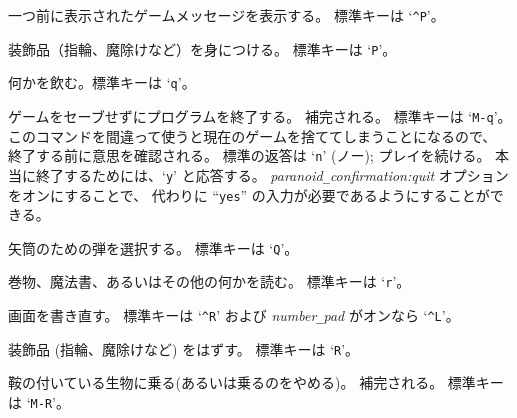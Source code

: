 一つ前に表示されたゲームメッセージを表示する。
標準キーは `{\tt \^{}P}'。
\item[\tb{\#puton}]
装飾品（指輪、魔除けなど）を身につける。
標準キーは `{\tt P}'。
\item[\tb{\#quaff}]
何かを飲む。標準キーは `{\tt q}'。
\item[\tb{\#quit}]
ゲームをセーブせずにプログラムを終了する。
補完される。
標準キーは `{\tt M-q}'。\\
このコマンドを間違って使うと現在のゲームを捨ててしまうことになるので、
終了する前に意思を確認される。
標準の返答は `{\tt n}' (ノー); プレイを続ける。
本当に終了するためには、`{\tt y}' と応答する。
{\it paranoid\verb+_+confirmation:quit\/} オプションをオンにすることで、
代わりに ``{\tt yes}'' の入力が必要であるようにすることができる。
\item[\tb{\#quiver}]
矢筒のための弾を選択する。
標準キーは `{\tt Q}'。
\item[\tb{\#read}]
巻物、魔法書、あるいはその他の何かを読む。
標準キーは `{\tt r}'。
\item[\tb{\#redraw}]
画面を書き直す。
標準キーは `{\tt \^{}R}' および
{\it number\verb+_+pad\/} がオンなら `{\tt \^{}L}'。
\item[\tb{\#remove}]
装飾品 (指輪、魔除けなど) をはずす。
標準キーは `{\tt R}'。
\item[\tb{\#ride}]
鞍の付いている生物に乗る(あるいは乗るのをやめる)。
補完される。
標準キーは `{\tt M-R}'。
\item[\tb{\#rub}]
